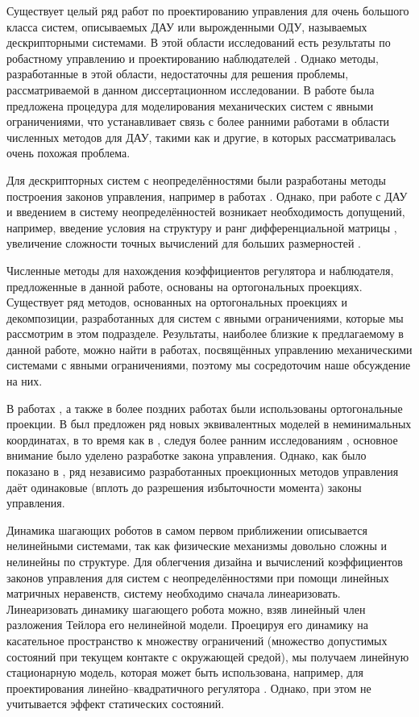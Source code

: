 Существует целый ряд работ по проектированию управления для очень большого класса систем, описываемых ДАУ или вырожденными ОДУ, называемых дескрипторными системами. В этой области исследований есть результаты по робастному управлению и проектированию наблюдателей \cite{Cheng2018, Darouach2014}. Однако методы, разработанные в этой области, недостаточны для решения проблемы, рассматриваемой в данном диссертационном исследовании. В работе \cite{Aghili2003} была предложена процедура для моделирования механических систем с явными ограничениями, что устанавливает связь с более ранними работами в области численных методов для ДАУ, такими как \cite{Liang1987} и другие, в которых рассматривалась очень похожая проблема. 

Для дескрипторных систем с неопределённостями были разработаны методы построения законов управления, например в работах \cite{Darouach2014, LIN19993319}. Однако, при работе с ДАУ и введением в систему неопределённостей возникает необходимость допущений, например, введение условия на структуру и ранг дифференциальной матрицы \cite{Cheng2017}, увеличение сложности точных вычислений для больших размерностей \cite{Zhang2006}. 

Численные методы для нахождения коэффициентов регулятора и наблюдателя, предложенные в данной работе, основаны на ортогональных проекциях. Существует ряд методов, основанных на ортогональных проекциях и декомпозиции, разработанных для систем с явными ограничениями, которые мы рассмотрим в этом подразделе. Результаты, наиболее близкие к предлагаемому в данной работе, можно найти в работах, посвящённых управлению механическими системами с явными ограничениями, поэтому мы сосредоточим наше обсуждение на них.

В работах \cite{Aghili2003, Aghili2005}, а также в более поздних работах \cite{Righetti2011, Mistry2010, Righetti2013} были использованы ортогональные проекции. В \cite{Aghili2003, Aghili2005} был предложен ряд новых эквивалентных моделей в неминимальных координатах, в то время как в \cite{Mistry2010, Righetti2011, Righetti2013}, следуя более ранним исследованиям \cite{Khatib2007, Sentis2005}, основное внимание было уделено разработке закона управления. Однако, как было показано в \cite{Righetti2011}, ряд независимо разработанных проекционных методов управления даёт одинаковые (вплоть до разрешения избыточности момента) законы управления.

Динамика шагающих роботов в самом первом приближении описывается нелинейными системами, так как физические механизмы довольно сложны и нелинейны по структуре. Для облегчения дизайна и вычислений коэффициентов законов управления для систем с неопределённостями при помощи линейных матричных неравенств, систему необходимо сначала линеаризовать. Линеаризовать динамику шагающего робота можно, взяв линейный член разложения Тейлора его нелинейной модели. Проецируя его динамику на касательное пространство к множеству ограничений (множество допустимых состояний при текущем контакте с окружающей средой), мы получаем линейную стационарную модель, которая может быть использована, например, для проектирования линейно--квадратичного регулятора \cite{mason2014full}. Однако, при этом не учитывается эффект статических состояний.

